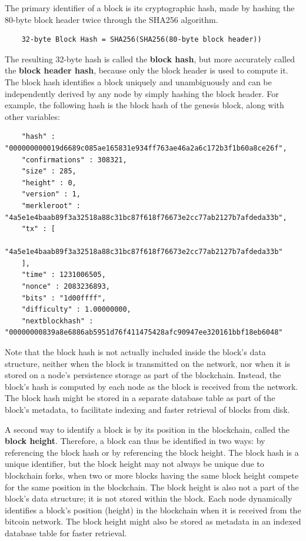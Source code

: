\documentclass{article}
\newcounter{example}[section]
\newcounter{algo}[section]
\begin{document}
    The primary identifier of a block is its cryptographic hash, made by hashing the 80-byte block header twice through the SHA256 algorithm.

    \begin{lstlisting}
    32-byte Block Hash = SHA256(SHA256(80-byte block header))
    \end{lstlisting}

    The resulting 32-byte hash is called the \textbf{block hash}, but more accurately called the \textbf{block header hash}, because only the block header is used to compute it. The block hash identifies a block uniquely and unambiguously and can be independently derived by any node by simply hashing the block header. For example, the following hash is the block hash of the genesis block, along with other variables:

    \begin{lstlisting}
    "hash" : "000000000019d6689c085ae165831e934ff763ae46a2a6c172b3f1b60a8ce26f",
    "confirmations" : 308321,
    "size" : 285,
    "height" : 0,
    "version" : 1,
    "merkleroot" : "4a5e1e4baab89f3a32518a88c31bc87f618f76673e2cc77ab2127b7afdeda33b",
    "tx" : [
        "4a5e1e4baab89f3a32518a88c31bc87f618f76673e2cc77ab2127b7afdeda33b"
    ],
    "time" : 1231006505,
    "nonce" : 2083236893,
    "bits" : "1d00ffff",
    "difficulty" : 1.00000000,
    "nextblockhash" : "00000000839a8e6886ab5951d76f411475428afc90947ee320161bbf18eb6048"
    \end{lstlisting}

    Note that the block hash is not actually included inside the block's data structure, neither when the block is transmitted on the network, nor when it is stored on a node's persistence storage as part of the blockchain. Instead, the block's hash is computed by each node as the block is received from the network. The block hash might be stored in a separate database table as part of the block's metadata, to facilitate indexing and faster retrieval of blocks from disk.

    A second way to identify a block is by its position in the blockchain, called the \textbf{block height}. Therefore, a block can thus be identified in two ways: by referencing the block hash or by referencing the block height. The block hash is a unique identifier, but the block height may not always be unique due to blockchain forks, when two or more blocks having the same block height compete for the same position in the blockchain. The block height is also not a part of the block's data structure; it is not stored within the block. Each node dynamically identifies a block's position (height) in the blockchain when it is received from the bitcoin network. The block height might also be stored as metadata in an indexed database table for faster retrieval.
\end{document}
